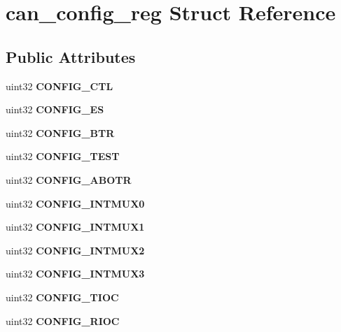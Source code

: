 \hypertarget{structcan__config__reg}{}\section{can\+\_\+config\+\_\+reg Struct Reference}
\label{structcan__config__reg}
\subsection*{Public Attributes}
\begin{DoxyCompactItemize}
\item 
\mbox{\label{structcan__config__reg_a2afb75ee6fef4f48555f9c4bc01782e9}} 
uint32 {\bfseries C\+O\+N\+F\+I\+G\+\_\+\+C\+TL}
\item 
\mbox{\label{structcan__config__reg_ae952056439d3021e5b41c9b1e9b22877}} 
uint32 {\bfseries C\+O\+N\+F\+I\+G\+\_\+\+ES}
\item 
\mbox{\label{structcan__config__reg_a2fe4f5ecefc9cbee9c7c9d99d3bd2d86}} 
uint32 {\bfseries C\+O\+N\+F\+I\+G\+\_\+\+B\+TR}
\item 
\mbox{\label{structcan__config__reg_a2b420dae4aad6376210652f3f5e41078}} 
uint32 {\bfseries C\+O\+N\+F\+I\+G\+\_\+\+T\+E\+ST}
\item 
\mbox{\label{structcan__config__reg_ab57bfd5bc20a4ea97bc5ed761dbd88e0}} 
uint32 {\bfseries C\+O\+N\+F\+I\+G\+\_\+\+A\+B\+O\+TR}
\item 
\mbox{\label{structcan__config__reg_a41bb31325f00fcf2771812fdeb829b3e}} 
uint32 {\bfseries C\+O\+N\+F\+I\+G\+\_\+\+I\+N\+T\+M\+U\+X0}
\item 
\mbox{\label{structcan__config__reg_aa56e83fc22f5c773f6a7280084730c39}} 
uint32 {\bfseries C\+O\+N\+F\+I\+G\+\_\+\+I\+N\+T\+M\+U\+X1}
\item 
\mbox{\label{structcan__config__reg_ae0ddfac9c5eebc71bb3e6ac991cf2b9e}} 
uint32 {\bfseries C\+O\+N\+F\+I\+G\+\_\+\+I\+N\+T\+M\+U\+X2}
\item 
\mbox{\label{structcan__config__reg_a0ff11964e5bf64948fd3845521dfe0cb}} 
uint32 {\bfseries C\+O\+N\+F\+I\+G\+\_\+\+I\+N\+T\+M\+U\+X3}
\item 
\mbox{\label{structcan__config__reg_a3123045de6683be1d58fdfb0f45f4e81}} 
uint32 {\bfseries C\+O\+N\+F\+I\+G\+\_\+\+T\+I\+OC}
\item 
\mbox{\label{structcan__config__reg_a2695d729acdb870f61755d8b6c04d929}} 
uint32 {\bfseries C\+O\+N\+F\+I\+G\+\_\+\+R\+I\+OC}
\end{DoxyCompactItemize}


